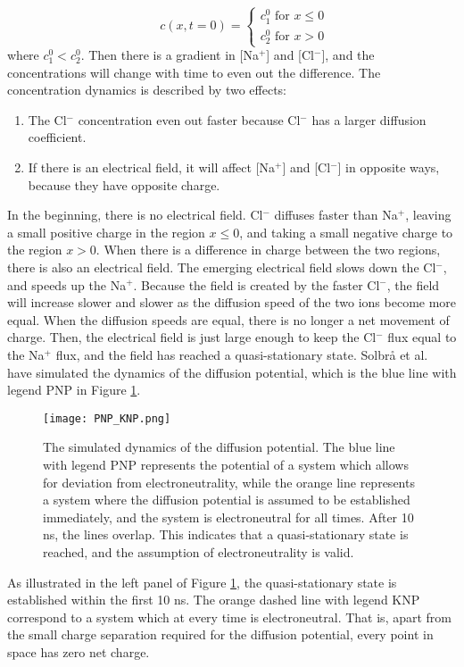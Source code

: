 \documentclass{article}
\begin{document}
\begin{equation}
 \qquad c\left(x,t=0\right) = \begin{cases}
  c_1^0 \text{ for } x \leq 0 \\
  c_2^0 \text{ for } x>0 
  \end{cases}
  \label{eq:step_function }
\end{equation}
where $c_1^0<c_2^0$. Then there is a gradient in [Na$^+$] and [Cl$^-$], and the concentrations will change with time to even out the difference. The concentration dynamics is described by two effects:
\begin{enumerate}
\item The Cl$^-$ concentration even out faster because Cl$^-$ has a larger diffusion coefficient. 
\item If there is an electrical field, it will affect  [Na$^+$] and [Cl$^-$] in opposite ways, because they have opposite charge.
\end{enumerate}
In the beginning, there is no electrical field. Cl$^-$ diffuses faster than Na$^+$, leaving a small positive charge in the region $x\leq 0$, and taking a small negative charge to the region $x>0$. When there is a difference in charge between the two regions, there is also an electrical field. The emerging electrical field slows down the Cl$^-$, and speeds up the Na$^+$. Because the field is created by the faster Cl$^-$, the field will increase slower and slower as the diffusion speed of the two ions become more equal. When the diffusion speeds are equal, there is no longer a net movement of charge. Then, the electrical field is just large enough to keep the Cl$^-$ flux equal to the Na$^+$ flux, and the field has reached a quasi-stationary state.  Solbr{\aa} et al.\ \cite{Solbraa} have simulated the dynamics of the diffusion potential, which is the blue line with legend PNP in Figure \ref{fig:PNP_KNP}.  

\begin{figure}
  \texttt{[image: PNP\_KNP.png]}
  \caption{The simulated dynamics of the diffusion potential. The blue line with legend PNP represents the potential of a system which allows for deviation from electroneutrality, while the orange line represents a system where the diffusion potential is assumed to be established immediately, and the system is electroneutral for all times. After 10 ns, the lines overlap. This indicates that a quasi-stationary state is reached, and the assumption of electroneutrality is valid\cite{Solbraa}.}
  \label{fig:PNP_KNP}
\end{figure}
As illustrated in the left panel of Figure \ref{fig:PNP_KNP}, the quasi-stationary state is established within the first 10 ns. The orange dashed line with legend KNP correspond to a system which at every time is electroneutral. That is, apart from the small charge separation required for the diffusion potential, every point in space has zero net charge. 
\end{document}
